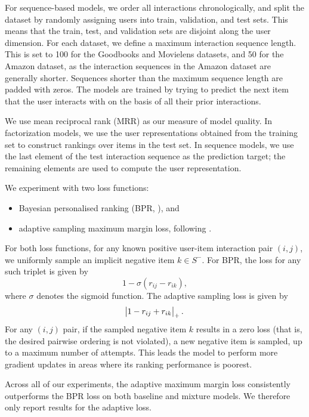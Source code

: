 \documentclass[sigconf]{acmart}
\newcommand\symUserInteractionSet{S}
\begin{document}
For sequence-based models, we order all interactions chronologically, and split the dataset by randomly assigning users into train, validation, and test sets. This means that the train, test, and validation sets are disjoint along the user dimension. For each dataset, we define a maximum interaction sequence length. This is set to 100 for the Goodbooks and Movielens datasets, and 50 for the Amazon dataset, as the interaction sequences in the Amazon dataset are generally shorter. Sequences shorter than the maximum sequence length are padded with zeros. The models are trained by trying to predict the next item that the user interacts with on the basis of all their prior interactions.

We use mean reciprocal rank (MRR) as our measure of model quality. In factorization models, we use the user representations obtained from the training set to construct rankings over items in the test set. In sequence models, we use the last element of the test interaction sequence as the prediction target; the remaining elements are used to compute the user representation.

We experiment with two loss functions:
\begin{itemize}
\item Bayesian personalised ranking (BPR, \citet{rendle2009bpr}), and
\item adaptive sampling maximum margin loss, following \citet{weston2011wsabie}.
\end{itemize}
For both loss functions, for any known positive user-item interaction pair $(i, j)$, we uniformly sample an implicit negative item $k \in \symUserInteractionSet^-$. For BPR, the loss for any such triplet is given by
\begin{equation}
1 - \sigma\left(r_{ij} - r_{ik}\right),
\end{equation}
where $\sigma$ denotes the sigmoid function.
The adaptive sampling loss is given by
\begin{equation}
\abs{1 - r_{ij} + r_{ik}}_{+}.
\end{equation}
For any $(i, j)$ pair, if the sampled negative item $k$ results in a zero loss (that is, the desired pairwise ordering is not violated), a new negative item is sampled, up to a maximum number of attempts. This leads the model to perform more gradient updates in areas where its ranking performance is poorest.

Across all of our experiments, the adaptive maximum margin loss consistently outperforms the BPR loss on both baseline and mixture models. We therefore only report results for the adaptive loss.
\end{document}
